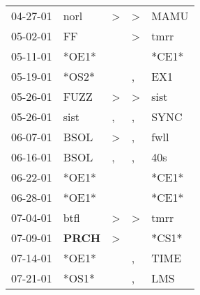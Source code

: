 \begin{supertabular}{p{0.07\textwidth}p{0.06\textwidth}p{0.02\textwidth}p{0.02\textwidth}p{0.06\textwidth}}
          04-27-01\textsuperscript{} &           norl\textsuperscript{} &     \textgreater &     \textgreater &           MAMU\textsuperscript{} \\
          05-02-01\textsuperscript{} &             FF\textsuperscript{} &                  &     \textgreater &           tmrr\textsuperscript{} \\
          05-11-01\textsuperscript{} &                            *OE1* &                  &                  &                            *CE1* \\
          05-19-01\textsuperscript{} &                            *OS2* &                  &                , &            EX1\textsuperscript{} \\
          05-26-01\textsuperscript{} &           FUZZ\textsuperscript{} &     \textgreater &     \textgreater &           sist\textsuperscript{} \\
          05-26-01\textsuperscript{} &           sist\textsuperscript{} &                , &                , &           SYNC\textsuperscript{} \\
          06-07-01\textsuperscript{} &           BSOL\textsuperscript{} &     \textgreater &                , &           fwll\textsuperscript{} \\
          06-16-01\textsuperscript{} &           BSOL\textsuperscript{} &                , &                , &            40s\textsuperscript{} \\
          06-22-01\textsuperscript{} &                            *OE1* &                  &                  &                            *CE1* \\
          06-28-01\textsuperscript{} &                            *OE1* &                  &                  &                            *CE1* \\
          07-04-01\textsuperscript{} &           btfl\textsuperscript{} &     \textgreater &     \textgreater &           tmrr\textsuperscript{} \\
          07-09-01\textsuperscript{} &  \textbf{PRCH\textsuperscript{}} &     \textgreater &                  &                            *CS1* \\
          07-14-01\textsuperscript{} &                            *OE1* &                  &                , &           TIME\textsuperscript{} \\
          07-21-01\textsuperscript{} &                            *OS1* &                  &                , &            LMS\textsuperscript{} \\

\end{supertabular}
